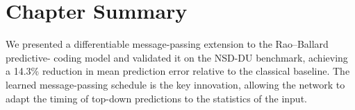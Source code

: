 \section{Chapter Summary}

We presented a differentiable message-passing extension to the Rao--Ballard predictive-
coding model and validated it on the NSD-DU benchmark, achieving a 14.3\% reduction in
mean prediction error relative to the classical baseline.  The learned message-passing
schedule is the key innovation, allowing the network to adapt the timing of top-down
predictions to the statistics of the input.

